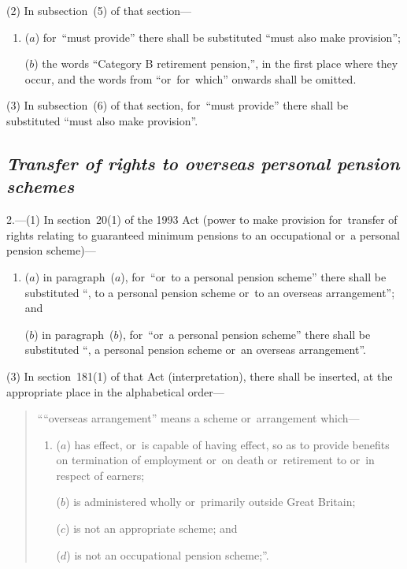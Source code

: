 \documentclass[12pt,a4paper]{article}
\begin{document}
(2) In subsection~(5)  of that section—
\begin{enumerate}\item[]
($a$) for~“must provide” there shall be substituted “must also make provision”;

($b$) the words “Category B retirement pension,”, in the first place where they occur, and the words from “or~for~which” onwards shall be omitted.
\end{enumerate}

(3) In subsection~(6)  of that section, for~“must provide” there shall be substituted “must also make provision”.

\subsection*{\itshape\sloppy Transfer of rights to overseas personal pension schemes}

2.---(1) In section~20(1)  of the 1993 Act (power to make provision for~transfer of rights relating to guaranteed minimum pensions to an occupational or~a personal pension scheme)—
\begin{enumerate}\item[]
($a$) in paragraph~($a$), for~“or~to a personal pension scheme” there shall be substituted “, to a personal pension scheme or~to an overseas arrangement”; and

($b$) in paragraph~($b$), for~“or~a personal pension scheme” there shall be substituted “, a personal pension scheme or~an overseas arrangement”.
\end{enumerate}

%

(3) In section~181(1)  of that Act (interpretation), there shall be inserted, at the appropriate place in the alphabetical order—
\begin{quotation}
““overseas arrangement” means a scheme or~arrangement which—
\begin{enumerate}\item[]
($a$) has effect, or~is capable of having effect, so as to provide benefits on termination of employment or~on death or~retirement to or~in respect of earners;

($b$) is administered wholly or~primarily outside Great Britain;

($c$) is not an appropriate scheme; and

($d$) is not an occupational pension scheme;”.
\end{enumerate}
\end{quotation}
\end{document}
